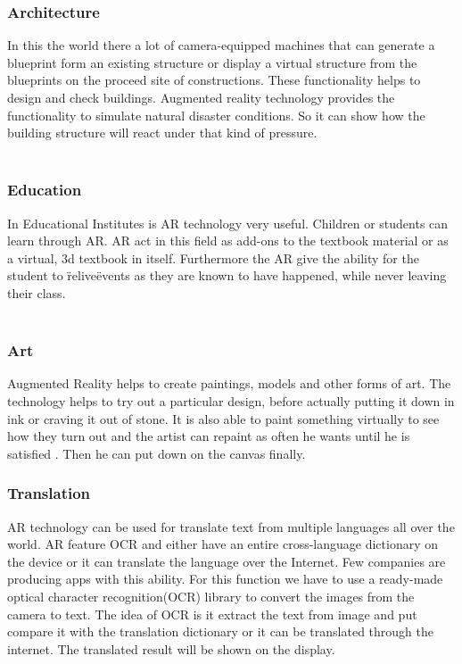 \subsubsection{Architecture}
In this the world there a lot of camera-equipped machines that can generate a blueprint form an existing structure or display a virtual structure from the blueprints on the proceed site of constructions.  These functionality helps to design and check buildings. Augmented  reality technology provides the functionality to simulate natural disaster conditions. So it can show how the building structure will react under that kind of pressure.
\\
\\
\subsubsection{Education}
In Educational Institutes is AR technology very useful. Children or students can learn through AR. AR act in this field as  add-ons to the textbook material or as a virtual, 3d textbook in itself. Furthermore the AR give the ability for the student to \"relive\" events as they are known to have happened, while never leaving their class.
\\
\\
\subsubsection{Art}
Augmented Reality helps  to create paintings, models and other forms of art.  The technology helps  to try out a particular design, before  actually putting it down in ink or craving it out of stone. It is also able to paint something virtually to see how they turn out and the artist can repaint as often he wants until he is satisfied . Then he can put down on the canvas finally.
\\
\subsubsection{Translation}
AR technology can be used for translate text from multiple languages all over the world. AR feature OCR and either have an entire cross-language dictionary on the device or it can translate the language over the Internet.    Few companies are producing apps with this ability. For this function we have to use  a ready-made optical character recognition(OCR) library to convert the images from the camera to text. The idea of OCR is it extract the text from image and put compare it with the translation dictionary or it can be translated through the internet. The translated result will be shown on the display.
\\

